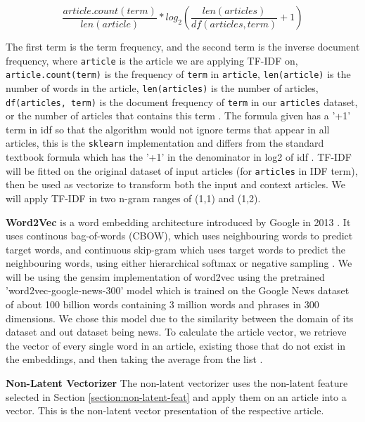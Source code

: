 \documentclass{article}
\begin{document}
\[\frac{article.count(term)}{len(article)} * log_2(\frac{len(articles)}{df(articles, term)} + 1)\]

The first term is the term frequency, and the second term is the inverse document frequency, where \texttt{article} is the article we are applying TF-IDF on, \texttt{article.count(term)} is the frequency of \texttt{term} in \texttt{article}, \texttt{len(article)} is the number of words in the article, \texttt{len(articles)} is the number of articles, \texttt{df(articles, term)} is the document frequency of \texttt{term} in our \texttt{articles} dataset, or the number of articles that contains this term  \cite{scikit-learn}. The formula given has a '+1' term in idf so that the algorithm would not ignore terms that appear in all articles, this is the \texttt{sklearn} implementation and differs from the standard textbook formula which has the '+1' in the denominator in log2 of idf  \cite{scikit-learn}. TF-IDF will be fitted on the original dataset of input articles (for \texttt{articles} in IDF term), then be used as vectorize to transform both the input and context articles. We will apply TF-IDF in two n-gram ranges of (1,1) and (1,2).

\textbf{Word2Vec} is a word embedding architecture introduced by Google in 2013 \cite{word2vec-google}. It uses continous bag-of-words (CBOW), which uses neighbouring words to predict target words, and continuous skip-gram which uses target words to predict the neighbouring words, using either hierarchical softmax or negative sampling \cite{gensim} \cite{mikolov2013efficient}. We will be using the gensim implementation of word2vec using the pretrained 'word2vec-google-news-300' model which is trained on the Google News dataset of about 100 billion words containing 3 million words and phrases in 300 dimensions. We chose this model due to the similarity between the domain of its dataset and out dataset being news. To calculate the article vector, we retrieve the vector of every single word in an article, existing those that do not exist in the embeddings, and then taking the average from the list \cite{alsuliman2022social}.

\textbf{Non-Latent Vectorizer}
The non-latent vectorizer uses the non-latent feature selected in Section \ref{section:non-latent-feat} and apply them on an article into a vector. This is the non-latent vector presentation of the respective article.
\end{document}
